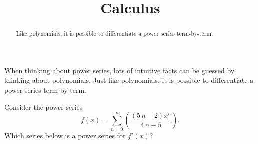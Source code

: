 \documentclass{ximera}
\title{Calculus}
\begin{document}
\begin{abstract}
  Like polynomials, it is possible to differentiate a power series term-by-term.
\end{abstract}

\maketitle

When thinking about power series, lots of intuitive facts can be guessed by thinking about polynomials.  Just like polynomials, it is possible to differentiate a power series term-by-term.


\begin{question}
  Consider the power series \[f(x) = \displaystyle\sum_{n=0}^\infty \left( \displaystyle\frac{ {\left(5 \, n - 2\right)} x^{n} }{4 \, n - 5} \right).\]  Which series below is a power series for \(f'(x)\)?


\end{question}
\end{document}
